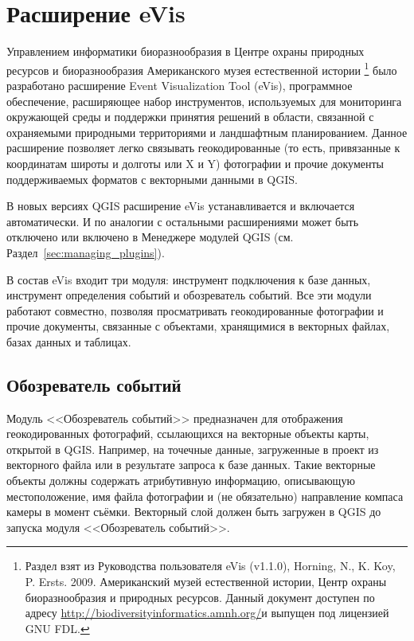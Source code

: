 
\section{Расширение eVis}\label{sec:evis}

Управлением информатики биоразнообразия в Центре охраны природных ресурсов
и биоразнообразия Американского музея естественной истории \footnote{Раздел
взят из Руководства пользователя eVis (v1.1.0), Horning, N., K. Koy, P.
Ersts. 2009. Американский музей естественной истории, Центр охраны
биоразнообразия и природных ресурсов. Данный документ доступен по адресу
\url{http://biodiversityinformatics.amnh.org/}и выпущен под лицензией GNU FDL.}
было разработано расширение Event Visualization Tool (eVis),
программное обеспечение, расширяющее набор инструментов, используемых для
мониторинга окружающей среды и поддержки принятия решений в области,
связанной с охраняемыми природными территориями и ландшафтным планированием.
Данное расширение позволяет легко связывать геокодированные (то есть,
привязанные к координатам широты и долготы или X и Y) фотографии и прочие
документы поддерживаемых форматов с векторными данными в QGIS.

В новых версиях QGIS расширение eVis устанавливается и включается
автоматически. И по аналогии с остальными расширениями может быть
отключено или включено в Менеджере модулей QGIS (см. Раздел~\ref{sec:managing_plugins}).

В состав eVis входит три модуля: инструмент подключения к базе данных,
инструмент определения событий и обозреватель событий. Все эти модули
работают совместно, позволяя просматривать геокодированные фотографии
и прочие документы, связанные с объектами, хранящимися в векторных файлах,
базах данных и таблицах.

\subsection{Обозреватель событий}\label{evis_browser}

Модуль <<Обозреватель событий>> предназначен для отображения геокодированных
фотографий, ссылающихся на векторные объекты карты, открытой в QGIS. Например,
на точечные данные, загруженные в проект из векторного файла или в результате
запроса к базе данных. Такие векторные объекты должны содержать атрибутивную
информацию, описывающую местоположение, имя файла фотографии и (не
обязательно) направление компаса камеры в момент съёмки. Векторный слой
должен быть загружен в QGIS до запуска модуля <<Обозреватель событий>>.

